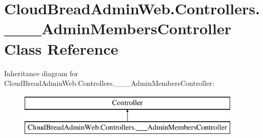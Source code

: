 \hypertarget{a00005}{}\section{Cloud\+Bread\+Admin\+Web.\+Controllers.\+\_\+\+\_\+\+\_\+\+Admin\+Members\+Controller Class Reference}
\label{a00005}
Inheritance diagram for Cloud\+Bread\+Admin\+Web.\+Controllers.\+\_\+\+\_\+\+\_\+\+Admin\+Members\+Controller\+:\begin{figure}[H]
\begin{center}
\leavevmode
\includegraphics[height=2.000000cm]{a00005}
\end{center}
\end{figure}
